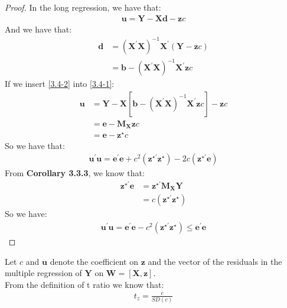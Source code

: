\documentclass{article}
\begin{document}
\begin{proof}
	In the long regression, we have that:
		\begin{align}
			\boldsymbol{u} = \boldsymbol{Y} - \boldsymbol{X} \boldsymbol{d} - \boldsymbol{z} c \label{3.4-1}
		\end{align}
	And we have that:
		\begin{align}
			\boldsymbol{d} &= (\boldsymbol{X}^\prime \boldsymbol{X})^{-1} \boldsymbol{X}^\prime (\boldsymbol{Y} - \boldsymbol{z} c) \nonumber \\
			&= \boldsymbol{b} - (\boldsymbol{X}^\prime \boldsymbol{X})^{-1} \boldsymbol{X}^\prime \boldsymbol{z} c \label{3.4-2}
		\end{align}
	If we insert \eqref{3.4-2} into \eqref{3.4-1}:
		\begin{align*}
			\boldsymbol{u} &= \boldsymbol{Y} - \boldsymbol{X} [\boldsymbol{b} - (\boldsymbol{X}^\prime \boldsymbol{X})^{-1} \boldsymbol{X}^\prime \boldsymbol{z} c] - \boldsymbol{z} c\\
			&= \boldsymbol{e} - \boldsymbol{M_X} \boldsymbol{z} c\\
			&= \boldsymbol{e} - \boldsymbol{z}^\star c
		\end{align*}
	So we have that:
		\begin{align*}
			\boldsymbol{u}^\prime \boldsymbol{u} = \boldsymbol{e}^\prime \boldsymbol{e} + c^2 (\boldsymbol{z}^{\star\prime} \boldsymbol{z}^\star) - 2c (\boldsymbol{z}^{\star\prime} \boldsymbol{e})
		\end{align*}
	From \textbf{Corollary 3.3.3}, we know that:
		\begin{align*}
			\boldsymbol{z}^{\star\prime} \boldsymbol{e} &= \boldsymbol{z}^{\star\prime} \boldsymbol{M_X} \boldsymbol{Y}\\
			&= c (\boldsymbol{z}^{\star\prime} \boldsymbol{z}^\star)
		\end{align*}
	So we have:
		\begin{align*}
			\boldsymbol{u}^\prime \boldsymbol{u} = \boldsymbol{e}^\prime \boldsymbol{e} - c^2 (\boldsymbol{z}^{\star\prime} \boldsymbol{z}^\star) \leq \boldsymbol{e}^\prime \boldsymbol{e}
		\end{align*} 
\end{proof}
\noindent Let $c$ and $\boldsymbol{u}$ denote the coefficient on $\boldsymbol{z}$ and the vector of the residuals in the multiple regression of $\boldsymbol{Y}$ on $\boldsymbol{W} = [\boldsymbol{X}, \boldsymbol{z}]$.\\
From the definition of t ratio we know that:
	\begin{align*}
		t_z = \frac{c}{SD(c)}
	\end{align*}
\end{document}
